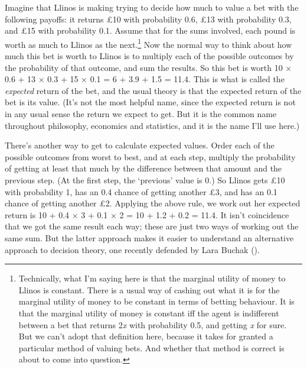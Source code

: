 \documentclass[
  10pt,
  letterpaper,
  twoside]{scrbook}
\begin{document}
Imagine that {Llinos} is making trying to decide how much to value a bet
with the following payoffs: it returns £10 with probability 0.6, £13
with probability 0.3, and £15 with probability 0.1. Assume that for the
sums involved, each pound is worth as much to {Llinos} as the
next.\footnote{Technically, what I'm saying here is that the marginal
  utility of money to {Llinos} is constant. There is a usual way of
  cashing out what it is for the marginal utility of money to be
  constant in terms of betting behaviour. It is that the marginal
  utility of money is constant iff the agent is indifferent between a
  bet that returns 2\emph{x} with probability 0.5, and getting \emph{x}
  for sure. But we can't adopt that definition here, because it takes
  for granted a particular method of valuing bets. And whether that
  method is correct is about to come into question.} Now the normal way
to think about how much this bet is worth to {Llinos} is to multiply
each of the possible outcomes by the probability of that outcome, and
sum the results. So this bet is worth 10 × 0.6 + 13 × 0.3 + 15 × 0.1 = 6
+ 3.9 + 1.5 = 11.4. This is what is called the \emph{expected} return of
the bet, and the usual theory is that the expected return of the bet is
its value. (It's not the most helpful name, since the expected return is
not in any usual sense the return we expect to get. But it is the common
name throughout philosophy, economics and statistics, and it is the name
I'll use here.)

There's another way to get to calculate expected values. Order each of
the possible outcomes from worst to best, and at each step, multiply the
probability of getting at least that much by the difference between that
amount and the previous step. (At the first step, the `previous' value
is 0.) So {Llinos} gets £10 with probability 1, has an 0.4 chance of
getting another £3, and has an 0.1 chance of getting another £2.
Applying the above rule, we work out her expected return is 10 + 0.4 × 3
+ 0.1 × 2 = 10 + 1.2 + 0.2 = 11.4. It isn't coincidence that we got the
same result each way; these are just two ways of working out the same
sum. But the latter approach makes it easier to understand an
alternative approach to decision theory, one recently defended by Lara
Buchak ().
\end{document}
